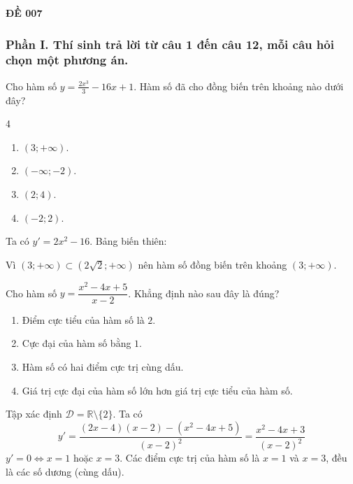 \begin{center}
	\textbf{{\Huge ĐỀ 007}}
\end{center}
\subsubsection*{Phần I. Thí sinh trả lời từ câu 1 đến câu 12, mỗi câu hỏi chọn một phương án.}
\setcounter{bt}{0}\setcounter{bt}{0}
\begin{baitap}
	Cho hàm số $y = \frac{2x^3}{3} - 16x + 1$. Hàm số đã cho đồng biến trên khoảng nào dưới đây?
	\begin{multicols}{4}
		\begin{enumerate}
			\item $(3; +\infty)$.
			\item $(-\infty; -2)$.
			\item $(2; 4)$.
			\item $(-2; 2)$.
		\end{enumerate}
	\end{multicols}
	\begin{traloi}
		Ta có $y' = 2x^2 - 16$. Bảng biến thiên:
		\begin{center}
		\end{center}
		Vì $(3; +\infty) \subset (2\sqrt{2}; +\infty)$ nên hàm số đồng biến trên khoảng $(3; +\infty)$.
	\end{traloi}
\end{baitap}

\begin{baitap}
	Cho hàm số $y = \dfrac{x^2 - 4x + 5}{x - 2}$. Khẳng định nào sau đây là đúng?
	\begin{enumerate}
		\item Điểm cực tiểu của hàm số là $2$.
		\item Cực đại của hàm số bằng $1$.
		\item Hàm số có hai điểm cực trị cùng dấu.
		\item Giá trị cực đại của hàm số lớn hơn giá trị cực tiểu của hàm số.
	\end{enumerate}
	\begin{traloi}
		\dapan{C}
		Tập xác định $\mathcal{D} = \mathbb{R} \setminus \{2\}$.
		Ta có $$y' = \frac{(2x - 4)(x - 2) - (x^2 - 4x + 5)}{(x - 2)^2} = \frac{x^2 - 4x + 3}{(x - 2)^2}$$
		$y' = 0 \Leftrightarrow x = 1$ hoặc $x = 3$.
		Các điểm cực trị của hàm số là $x = 1$ và $x = 3$, đều là các số dương (cùng dấu).
	\end{traloi}
\end{baitap}

